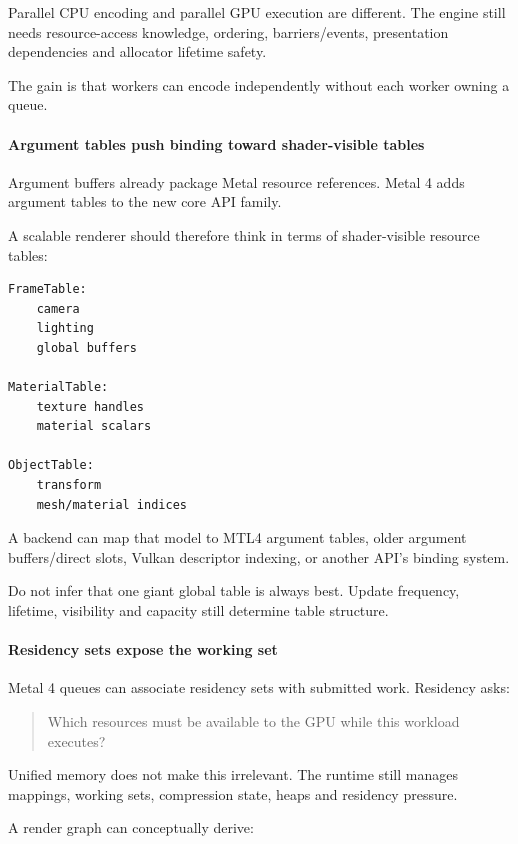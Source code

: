 Parallel CPU encoding and parallel GPU execution are different. The engine still needs resource-access knowledge, ordering, barriers/events, presentation dependencies and allocator lifetime safety.

The gain is that workers can encode independently without each worker owning a queue.

\paragraph{Argument tables push binding toward shader-visible tables}\label{argument-tables-push-binding-toward-shader-visible-tables}

Argument buffers already package Metal resource references. Metal 4 adds argument tables to the new core API family.

A scalable renderer should therefore think in terms of shader-visible resource tables:

\begin{verbatim}
FrameTable:
    camera
    lighting
    global buffers

MaterialTable:
    texture handles
    material scalars

ObjectTable:
    transform
    mesh/material indices
\end{verbatim}

A backend can map that model to MTL4 argument tables, older argument buffers/direct slots, Vulkan descriptor indexing, or another API's binding system.

Do not infer that one giant global table is always best. Update frequency, lifetime, visibility and capacity still determine table structure.

\paragraph{Residency sets expose the working set}\label{residency-sets-expose-the-working-set}

Metal 4 queues can associate residency sets with submitted work. Residency asks:

\begin{quote}
Which resources must be available to the GPU while this workload executes?
\end{quote}

Unified memory does not make this irrelevant. The runtime still manages mappings, working sets, compression state, heaps and residency pressure.

A render graph can conceptually derive:

